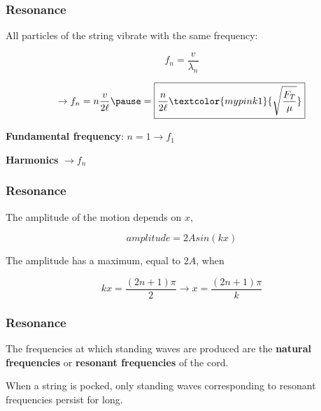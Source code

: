 \documentclass[]{beamer}
\begin{document}



\begin{frame}
\frametitle{Resonance}


All particles of the string vibrate with
the same frequency:

\begin{equation}
f_n=\frac{v}{\lambda_n}
\end{equation}

\pause

\begin{equation}
\rightarrow f_n=n \frac{v}{2\ell}\pause = \boxed{\frac{n}{2\ell} \textcolor{mypink1}{ \sqrt{\frac{F_T}{\mu}}}}
\end{equation}

\pause



\textcolor{mypink1}{\textbf{Fundamental frequency}:} $n=1\rightarrow f_1$
  
\vspace{3mm}

\textcolor{mypink1}{\textbf{Harmonics}} $\rightarrow  f_n$



  \end{frame}




\begin{frame}
  \frametitle{Resonance}

The amplitude of the motion depends on $x$,
  
  
  \begin{equation*}
  amplitude=2Asin(kx)
  \end{equation*}
  
  The amplitude has a maximum, equal to $2A$, when
  
  \begin{equation}
   kx=\frac{(2n+1)\pi}{2} \rightarrow x=\frac{(2 n+1)\pi}{k}
  \end{equation}
  

  
  
    \end{frame}







\begin{frame}
\frametitle{Resonance}




The frequencies at which standing waves are produced are the \textbf{natural frequencies}
or \textbf{resonant frequencies} of the cord.



When a  string is pocked, only standing waves corresponding to resonant frequencies persist for long.



  \end{frame}
\end{document}
